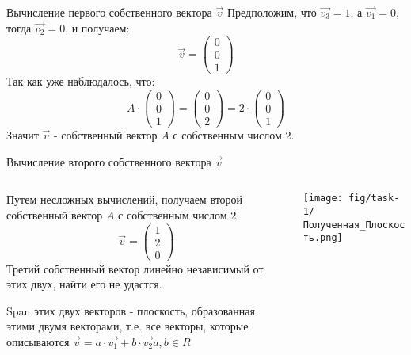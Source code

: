 \begin{frame}{Вычисление первого собственного вектора $\vec{v}$}
Предположим, что $\vec{v_{3}} = 1$, а $\vec{v_{1}} = 0$, тогда $\vec{v_{2}} = 0$, и получаем:
\[
\vec{v}=\left(\begin{array}{l}
    0 \\
    0 \\
    1
\end{array}\right)
\]
Так как уже наблюдалось, что:
\[
A \cdot \left(\begin{array}{l}
    0 \\
    0 \\
    1
\end{array}\right) = 
\left(\begin{array}{l}
    0 \\
    0 \\
    2
\end{array}\right) = 
2 \cdot \left(\begin{array}{l}
    0 \\
    0 \\
    1
\end{array}\right)
\]
Значит $\vec{v}$ - собственный вектор $A$ с собственным числом 2. 
\end{frame}


\begin{frame}{Вычисление второго собственного вектора $\vec{v}$}
\begin{columns}
\begin{column}{0.5\paperwidth}
Путем несложных вычислений, получаем второй собственный вектор $A$ с собственным числом 2
\[
\vec{v}=\left(\begin{array}{l}
    1 \\
    2 \\
    0
\end{array}\right)
\]
Третий собственный вектор линейно независимый от этих двух, найти его не удастся. 

Span этих двух векторов - плоскость, образованная этими двумя векторами, т.е. все векторы, которые описываются $\vec{v} = a \cdot \vec{v_{1}} + b \cdot \vec{v_{2}}  a,b \in R$
\end{column}
\begin{column}{0.4\paperwidth}
\texttt{[image: fig/task-1/Полученная\_Плоскость.png]}
\end{column}
\end{columns}
\end{frame}

